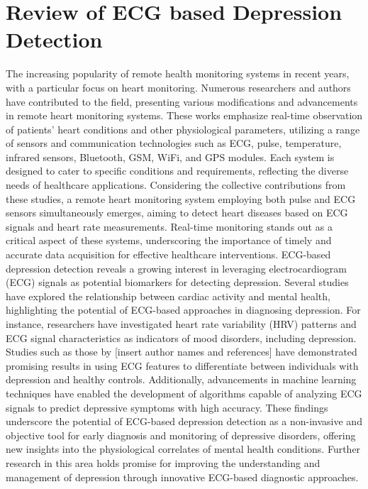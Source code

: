 \section{Review of ECG based Depression Detection}
The increasing popularity of remote health monitoring systems in recent years, with a particular focus on heart monitoring. Numerous researchers and authors have contributed to the field, presenting various modifications and advancements in remote heart monitoring systems. These works emphasize real-time observation of patients' heart conditions and other physiological parameters, utilizing a range of sensors and communication technologies such as ECG, pulse, temperature, infrared sensors, Bluetooth, GSM, WiFi, and GPS modules. Each system is designed to cater to specific conditions and requirements, reflecting the diverse needs of healthcare applications. Considering the collective contributions from these studies, a remote heart monitoring system employing both pulse and ECG sensors simultaneously emerges, aiming to detect heart diseases based on ECG signals and heart rate measurements. Real-time monitoring stands out as a critical aspect of these systems, underscoring the importance of timely and accurate data acquisition for effective healthcare interventions.
ECG-based depression detection reveals a growing interest in leveraging electrocardiogram (ECG) signals as potential biomarkers for detecting depression. Several studies have explored the relationship between cardiac activity and mental health, highlighting the potential of ECG-based approaches in diagnosing depression. For instance, researchers have investigated heart rate variability\cite{tiwari2021analysis} (HRV) patterns and ECG signal characteristics as indicators of mood disorders, including depression. Studies such as those by [insert author names and references] have demonstrated promising results in using ECG features to differentiate between individuals with depression and healthy controls. Additionally, advancements in machine learning techniques have enabled the development of algorithms capable of analyzing ECG signals to predict depressive symptoms with high accuracy. These findings underscore the potential of ECG-based depression detection as a non-invasive and objective tool for early diagnosis and monitoring of depressive disorders, offering new insights into the physiological correlates of mental health conditions. Further research in this area holds promise for improving the understanding and management of depression through innovative ECG-based diagnostic approaches.
\pagebreak
